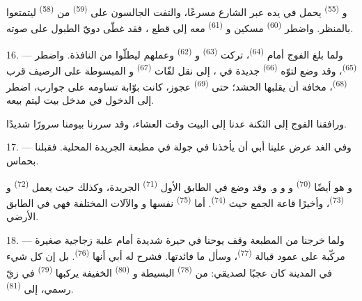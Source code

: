 \VUsaut{3.0mm}

و \textsuperscript{(55)} يحمل  في يده
عبر الشارع مسرعًا، والتفت الجالسون على  \textsuperscript{(59)}
من  \textsuperscript{(58)} ليتمتعوا بالمنظر. واضطر
 \textsuperscript{(60)} مسكين و \textsuperscript{(61)}
معه إلى قطع ، فقد غطّى دويّ الطبول على صوته.

16. --- ولما بلغ الفوج أمام  \textsuperscript{(64)}، تركت
 \textsuperscript{(63)} و \textsuperscript{(62)}
 وعملهم ليطلّوا من النافذة. واضطر 
\textsuperscript{(65)}، وقد وضع لتوّه  \textsuperscript{(66)} جديدة في
، إلى نقل لفّات  \textsuperscript{(67)}
و المبسوطة على الرصيف قرب 
\textsuperscript{(68)}، مخافة أن يقلبها الحشد؛ حتى 
\textsuperscript{(69)} عجوز، كانت بوّابة تساومه على جوارب، اضطر إلى الدخول في
مدخل بيت ليتم بيعه.

ورافقنا الفوج إلى الثكنة  عدنا إلى البيت وقت العشاء، وقد سررنا
بيومنا سرورًا شديدًا.

\VUsaut{3.0mm}

17. --- وفي الغد عرض علينا أبي أن يأخذنا في جولة في مطبعة الجريدة
المحلية. فقبلنا بحماس.

و هو أيضًا  \textsuperscript{(70)}
و و و. وقد وضع في الطابق
الأول  \textsuperscript{(71)} الجريدة، وكذلك  حيث يعمل  \textsuperscript{(72)}
و \textsuperscript{(73)}، وأخيرًا قاعة الجمع حيث
 \textsuperscript{(74)}. أما  \textsuperscript{(75)}
نفسها و والآلات المختلفة فهي في الطابق الأرضي.

\VUsaut{3.0mm}

18. --- ولما خرجنا من المطبعة وقف يوحنا في حيرة شديدة أمام علبة زجاجية
صغيرة مركّبة على عمود قبالة  \textsuperscript{(77)}، وسأل
ما فائدتها. فشرح له أبي أنها  \textsuperscript{(76)}. بل
إن كل شيء في المدينة كان عجبًا لصديقي: من 
\textsuperscript{(78)} البسيطة و \textsuperscript{(80)}
الخفيفة يركبها  \textsuperscript{(79)} في زيّ رسمي، إلى  \textsuperscript{(81)}.

